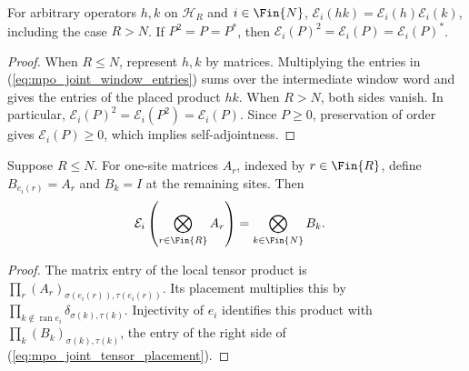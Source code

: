 \begin{theorem}
    \label{thm:mpo_joint_cyclic_projection_transport}
    For arbitrary operators $h,k$ on $\mathcal H_R$ and $i\in\Fin{N}$,
    $\mathcal E_i(hk)=\mathcal E_i(h)\mathcal E_i(k)$, including the
    case $R>N$. If $P^2=P=P^*$, then
    $\mathcal E_i(P)^2=\mathcal E_i(P)=\mathcal E_i(P)^*$.
\end{theorem}
\begin{proof}
    When $R\leq N$, represent $h,k$ by matrices. Multiplying the entries
    in (\ref{eq:mpo_joint_window_entries}) sums over the intermediate
    window word and gives the entries of the placed product $hk$.
    When $R>N$, both sides vanish. In particular,
    $\mathcal E_i(P)^2=\mathcal E_i(P^2)=\mathcal E_i(P)$.
    Since $P\geq0$, preservation of order gives $\mathcal E_i(P)\geq0$,
    which implies self-adjointness.
\end{proof}

\begin{theorem}
    \label{thm:mpo_joint_cyclic_tensor_placement}
    Suppose $R\leq N$. For one-site matrices $A_r$, indexed by
    $r\in\Fin{R}$, define $B_{e_i(r)}=A_r$ and $B_k=I$ at the
    remaining sites. Then
    \begin{align}
        \mathcal E_i\left(\bigotimes_{r\in\Fin{R}}A_r\right)
         & =\bigotimes_{k\in\Fin{N}}B_k.
        \label{eq:mpo_joint_tensor_placement}
    \end{align}
\end{theorem}
\begin{proof}
    The matrix entry of the local tensor product is
    $\prod_r(A_r)_{\sigma(e_i(r)),\tau(e_i(r))}$.
    Its placement multiplies this by
    $\prod_{k\notin\operatorname{ran}e_i}\delta_{\sigma(k),\tau(k)}$.
    Injectivity of $e_i$ identifies this product with
    $\prod_k(B_k)_{\sigma(k),\tau(k)}$, the entry of the right side
    of (\ref{eq:mpo_joint_tensor_placement}).
\end{proof}

